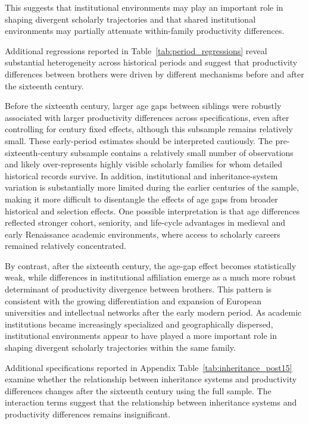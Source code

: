 This suggests that institutional environments may play an important role in shaping divergent scholarly trajectories and that shared institutional environments may partially attenuate within-family productivity differences.

Additional regressions reported in Table~\ref{tab:period_regressions} reveal substantial heterogeneity across historical periods and suggest that productivity differences between brothers were driven by different mechanisms before and after the sixteenth century.

Before the sixteenth century, larger age gaps between siblings were robustly associated with larger productivity differences across specifications, even after controlling for century fixed effects, although this subsample remains relatively small. These early-period estimates should be interpreted cautiously. The pre-sixteenth-century subsample contains a relatively small number of observations and likely over-represents highly visible scholarly families for whom detailed historical records survive. In addition, institutional and inheritance-system variation is substantially more limited during the earlier centuries of the sample, making it more difficult to disentangle the effects of age gaps from broader historical and selection effects. One possible interpretation is that age differences reflected stronger cohort, seniority, and life-cycle advantages in medieval and early Renaissance academic environments, where access to scholarly careers remained relatively concentrated.

By contrast, after the sixteenth century, the age-gap effect becomes statistically weak, while differences in institutional affiliation emerge as a much more robust determinant of productivity divergence between brothers. This pattern is consistent with the growing differentiation and expansion of European universities and intellectual networks after the early modern period. As academic institutions became increasingly specialized and geographically dispersed, institutional environments appear to have played a more important role in shaping divergent scholarly trajectories within the same family.

Additional specifications reported in Appendix Table~\ref{tab:inheritance_post15} examine whether the relationship between inheritance systems and productivity differences changes after the sixteenth century using the full sample. The interaction terms suggest that the relationship between inheritance systems and productivity differences remains insignificant.

